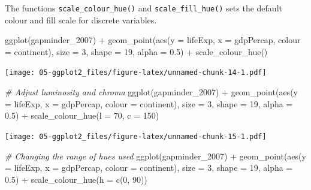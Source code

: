 \documentclass[
]{book}
\newenvironment{Shaded}{\begin{snugshade}}{\end{snugshade}}
\newcommand{\AttributeTok}[1]{\textcolor[rgb]{0.77,0.63,0.00}{#1}}
\newcommand{\CommentTok}[1]{\textcolor[rgb]{0.56,0.35,0.01}{\textit{#1}}}
\newcommand{\DecValTok}[1]{\textcolor[rgb]{0.00,0.00,0.81}{#1}}
\newcommand{\FloatTok}[1]{\textcolor[rgb]{0.00,0.00,0.81}{#1}}
\newcommand{\FunctionTok}[1]{\textcolor[rgb]{0.00,0.00,0.00}{#1}}
\newcommand{\NormalTok}[1]{#1}
\newcommand{\SpecialCharTok}[1]{\textcolor[rgb]{0.00,0.00,0.00}{#1}}
\begin{document}
The functions \texttt{scale\_colour\_hue()} and \texttt{scale\_fill\_hue()} sets the default colour and fill scale for discrete variables.

\begin{Shaded}
\begin{Highlighting}[]
\FunctionTok{ggplot}\NormalTok{(gapminder\_2007) }\SpecialCharTok{+} 
  \FunctionTok{geom\_point}\NormalTok{(}\FunctionTok{aes}\NormalTok{(}\AttributeTok{y =}\NormalTok{ lifeExp, }\AttributeTok{x =}\NormalTok{ gdpPercap, }\AttributeTok{colour =}\NormalTok{ continent), }\AttributeTok{size =} \DecValTok{3}\NormalTok{, }
             \AttributeTok{shape =} \DecValTok{19}\NormalTok{, }\AttributeTok{alpha =} \FloatTok{0.5}\NormalTok{) }\SpecialCharTok{+}
  \FunctionTok{scale\_colour\_hue}\NormalTok{()}
\end{Highlighting}
\end{Shaded}

\texttt{[image: 05-ggplot2\_files/figure-latex/unnamed-chunk-14-1.pdf]}

\begin{Shaded}
\begin{Highlighting}[]
\CommentTok{\# Adjust luminosity and chroma}
\FunctionTok{ggplot}\NormalTok{(gapminder\_2007) }\SpecialCharTok{+} 
  \FunctionTok{geom\_point}\NormalTok{(}\FunctionTok{aes}\NormalTok{(}\AttributeTok{y =}\NormalTok{ lifeExp, }\AttributeTok{x =}\NormalTok{ gdpPercap, }\AttributeTok{colour =}\NormalTok{ continent), }\AttributeTok{size =} \DecValTok{3}\NormalTok{, }
             \AttributeTok{shape =} \DecValTok{19}\NormalTok{, }\AttributeTok{alpha =} \FloatTok{0.5}\NormalTok{) }\SpecialCharTok{+}
  \FunctionTok{scale\_colour\_hue}\NormalTok{(}\AttributeTok{l =} \DecValTok{70}\NormalTok{, }\AttributeTok{c =} \DecValTok{150}\NormalTok{)}
\end{Highlighting}
\end{Shaded}

\texttt{[image: 05-ggplot2\_files/figure-latex/unnamed-chunk-15-1.pdf]}

\begin{Shaded}
\begin{Highlighting}[]


\CommentTok{\# Changing the range of hues used}
\FunctionTok{ggplot}\NormalTok{(gapminder\_2007) }\SpecialCharTok{+} 
  \FunctionTok{geom\_point}\NormalTok{(}\FunctionTok{aes}\NormalTok{(}\AttributeTok{y =}\NormalTok{ lifeExp, }\AttributeTok{x =}\NormalTok{ gdpPercap, }\AttributeTok{colour =}\NormalTok{ continent), }\AttributeTok{size =} \DecValTok{3}\NormalTok{, }
             \AttributeTok{shape =} \DecValTok{19}\NormalTok{, }\AttributeTok{alpha =} \FloatTok{0.5}\NormalTok{) }\SpecialCharTok{+}
  \FunctionTok{scale\_colour\_hue}\NormalTok{(}\AttributeTok{h =} \FunctionTok{c}\NormalTok{(}\DecValTok{0}\NormalTok{, }\DecValTok{90}\NormalTok{))}
\end{Highlighting}
\end{Shaded}
\end{document}
